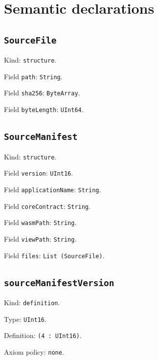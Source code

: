 \documentclass[11pt]{article}
\begin{document}
\section*{Semantic declarations}
\subsection*{\texttt{SourceFile}}
\noindent Kind: \texttt{structure}.\par
\noindent Field \texttt{path}: \texttt{String}.\par
\noindent Field \texttt{sha256}: \texttt{ByteArray}.\par
\noindent Field \texttt{byteLength}: \texttt{UInt64}.\par
\subsection*{\texttt{SourceManifest}}
\noindent Kind: \texttt{structure}.\par
\noindent Field \texttt{version}: \texttt{UInt16}.\par
\noindent Field \texttt{applicationName}: \texttt{String}.\par
\noindent Field \texttt{coreContract}: \texttt{String}.\par
\noindent Field \texttt{wasmPath}: \texttt{String}.\par
\noindent Field \texttt{viewPath}: \texttt{String}.\par
\noindent Field \texttt{files}: \texttt{List (SourceFile)}.\par
\subsection*{\texttt{sourceManifestVersion}}
\noindent Kind: \texttt{definition}.\par
\noindent Type: \texttt{UInt16}.\par
\noindent Definition: \texttt{(4 : UInt16)}.\par
\noindent Axiom policy: \texttt{none}.\par
\end{document}
